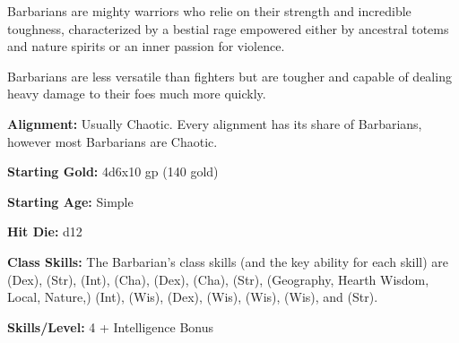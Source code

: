 
Barbarians are mighty warriors who relie on their strength and incredible toughness, characterized by a bestial rage empowered either by ancestral totems and nature spirits or an inner passion for violence.

Barbarians are less versatile than fighters but are tougher and capable of dealing heavy damage to their foes much more quickly.

\textbf{Alignment:} Usually Chaotic. Every alignment has its share of Barbarians, however most Barbarians are Chaotic.

\textbf{Starting Gold:} 4d6x10 gp (140 gold)

\textbf{Starting Age:} Simple

\textbf{Hit Die:} d12

\textbf{Class Skills:} The Barbarian's class skills (and the key ability for each skill) are  (Dex),  (Str),  (Int),  (Cha),  (Dex),  (Cha),  (Str),  (Geography, Hearth Wisdom, Local, Nature,) (Int),  (Wis),  (Dex),  (Wis),  (Wis),  (Wis), and  (Str).

\textbf{Skills/Level:} 4 + Intelligence Bonus

\goodbab{}
\goodfor{}
\poorref{}
\poorwil{}

\begin{classtable}
\end{classtable}

